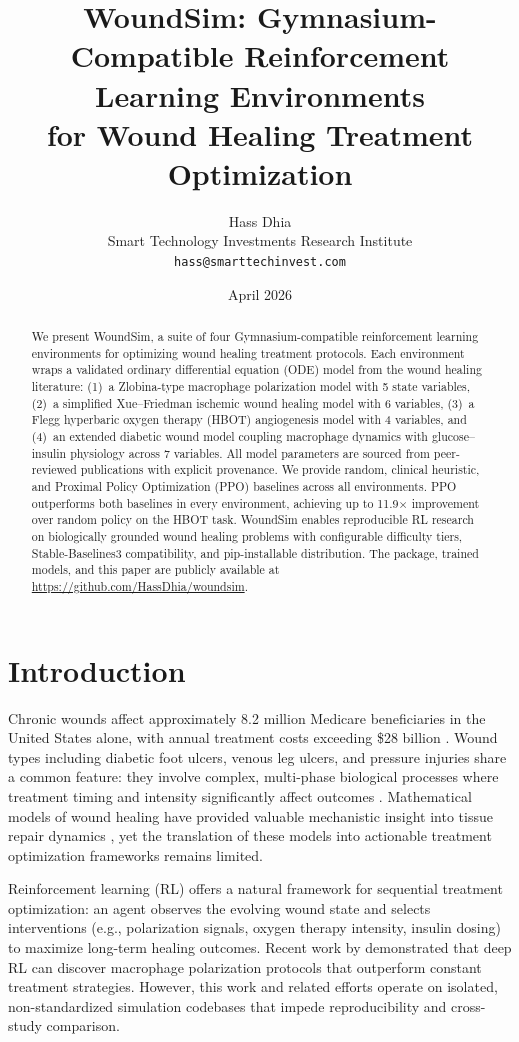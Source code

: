 \documentclass[11pt,a4paper]{article}
\title{WoundSim: Gymnasium-Compatible Reinforcement Learning Environments\\for Wound Healing Treatment Optimization}
\author{Hass Dhia\\
Smart Technology Investments Research Institute\\
\texttt{hass@smarttechinvest.com}}
\date{April 2026}
\begin{document}
\maketitle

\begin{abstract}
We present WoundSim, a suite of four Gymnasium-compatible reinforcement learning environments for optimizing wound healing treatment protocols. Each environment wraps a validated ordinary differential equation (ODE) model from the wound healing literature: (1)~a Zlobina-type macrophage polarization model with 5 state variables, (2)~a simplified Xue--Friedman ischemic wound healing model with 6 variables, (3)~a Flegg hyperbaric oxygen therapy (HBOT) angiogenesis model with 4 variables, and (4)~an extended diabetic wound model coupling macrophage dynamics with glucose--insulin physiology across 7 variables. All model parameters are sourced from peer-reviewed publications with explicit provenance. We provide random, clinical heuristic, and Proximal Policy Optimization (PPO) baselines across all environments. PPO outperforms both baselines in every environment, achieving up to 11.9$\times$ improvement over random policy on the HBOT task. WoundSim enables reproducible RL research on biologically grounded wound healing problems with configurable difficulty tiers, Stable-Baselines3 compatibility, and pip-installable distribution. The package, trained models, and this paper are publicly available at \url{https://github.com/HassDhia/woundsim}.
\end{abstract}

\section{Introduction}

Chronic wounds affect approximately 8.2 million Medicare beneficiaries in the United States alone, with annual treatment costs exceeding \$28 billion \citep{sen2009}. Wound types including diabetic foot ulcers, venous leg ulcers, and pressure injuries share a common feature: they involve complex, multi-phase biological processes where treatment timing and intensity significantly affect outcomes \citep{brewer2020, schultz2003}. Mathematical models of wound healing have provided valuable mechanistic insight into tissue repair dynamics \citep{sherratt1990, menon2017, gomez2019}, yet the translation of these models into actionable treatment optimization frameworks remains limited.

Reinforcement learning (RL) offers a natural framework for sequential treatment optimization: an agent observes the evolving wound state and selects interventions (e.g., polarization signals, oxygen therapy intensity, insulin dosing) to maximize long-term healing outcomes. Recent work by \citet{lu2024} demonstrated that deep RL can discover macrophage polarization protocols that outperform constant treatment strategies. However, this work and related efforts operate on isolated, non-standardized simulation codebases that impede reproducibility and cross-study comparison.
\end{document}
